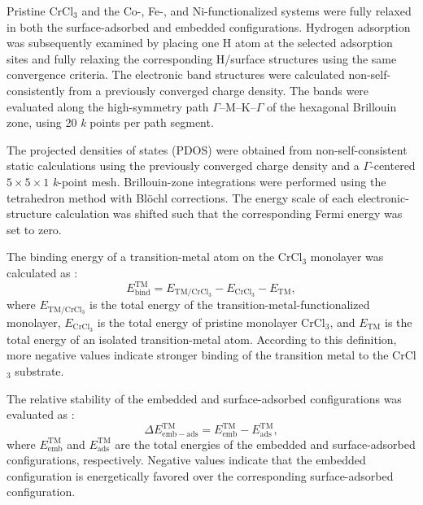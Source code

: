 \documentclass[journal=jacsat,manuscript=article]{achemso}
\begin{document}
Pristine CrCl$_3$ and the Co-, Fe-, and Ni-functionalized systems were fully relaxed in both the surface-adsorbed and embedded configurations. Hydrogen adsorption was subsequently examined by placing one H atom at the selected adsorption sites and fully relaxing the corresponding H/surface structures using the same convergence criteria. The electronic band structures were calculated non-self-consistently from a previously converged charge density. The bands were evaluated along the high-symmetry path $\Gamma$--M--K--$\Gamma$ of the hexagonal Brillouin zone, using 20 \textit{k} points per path segment.

The projected densities of states (PDOS) were obtained from non-self-consistent static calculations using the previously converged charge density and a $\Gamma$-centered $5 \times 5 \times 1$ \textit{k}-point mesh. Brillouin-zone integrations were performed using the tetrahedron method with Blöchl corrections. The energy scale of each electronic-structure calculation was shifted such that the corresponding Fermi energy was set to zero.

The binding energy of a transition-metal atom on the CrCl$_3$ monolayer was calculated as \cite{Liao2022,Sholl2009DensityTheory,Martin2004ElectronicMethods}:
\begin{equation}
    E_{\mathrm{bind}}^{\mathrm{TM}}
    =
    E_{\mathrm{TM/CrCl_3}}
    -
    E_{\mathrm{CrCl_3}}
    -
    E_{\mathrm{TM}},
    \label{eq:TM_binding}
\end{equation}
where $E_{\mathrm{TM/CrCl_3}}$ is the total energy of the transition-metal-functionalized monolayer, $E_{\mathrm{CrCl_3}}$ is the total energy of pristine monolayer CrCl$_3$, and $E_{\mathrm{TM}}$ is the total energy of an isolated transition-metal atom. According to this definition, more negative values indicate stronger binding of the transition metal to the CrCl$_3$ substrate.

The relative stability of the embedded and surface-adsorbed configurations was evaluated as \cite{Liao2022,Sholl2009DensityTheory,Martin2004ElectronicMethods}:
\begin{equation}
    \Delta E_{\mathrm{emb-ads}}^{\mathrm{TM}}
    =
    E_{\mathrm{emb}}^{\mathrm{TM}}
    -
    E_{\mathrm{ads}}^{\mathrm{TM}},
    \label{eq:relative_stability}
\end{equation}
where $E_{\mathrm{emb}}^{\mathrm{TM}}$ and $E_{\mathrm{ads}}^{\mathrm{TM}}$ are the total energies of the embedded and surface-adsorbed configurations, respectively. Negative values indicate that the embedded configuration is energetically favored over the corresponding surface-adsorbed configuration.
\end{document}
